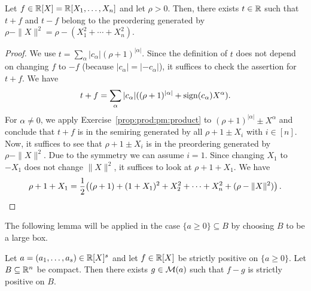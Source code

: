 \begin{lemma} \label{lem:t:minus:squares}
	Let $f \in \mathbb{R}[X] = \mathbb{R}[X_1,\ldots,X_n]$ and let $\rho > 0$. Then, there exists $t \in \mathbb{R}$ such that $t + f$ and $t- f$ belong to the preordering generated by $\rho - \|X\|^2 = \rho - (X_1^2 + \cdots + X_n^2)$. 
\end{lemma}
\begin{proof} 
	We use $t = \sum_\alpha |c_\alpha| (\rho+1)^{|\alpha|}$. Since the definition of $t$ does not depend on changing $f$ to $-f$ (because $|c_\alpha| = |-c_\alpha|$), it suffices to check the assertion for $t + f$. We have 
	\[
		t+ f = \sum_\alpha |c_\alpha| ( (\rho+1)^{|\alpha|} + \operatorname{sign}(c_\alpha) X^\alpha) .
	\]
	For $\alpha \ne 0$, we apply Exercise~\ref{prop:prod:pm:product} to  $(\rho+1)^{|\alpha|} \pm X^\alpha$ and conclude that $t+f$ is in the semiring generated by all $\rho+1 \pm X_i$ with $i \in [n]$. Now, it suffices to see that $\rho+1 \pm X_i$ is in the preordering generated by $\rho - \|X\|^2$. Due to the symmetry we can assume $i=1$. Since changing $X_1$ to $-X_1$ does not change $\|X\|^2$, it suffices to look at $\rho + 1 + X_1$. We have
	\[
		\rho+1 + X_1 = \frac{1}{2} \bigl( (\rho+1) + (1+X_1)^2 + X_2^2 + \cdots + X_n^2  + (\rho - \|X\|^2) \bigr) \,.\qedhere
	\]
\end{proof}
%
%
The following lemma will be applied in the case $\{a \ge 0 \} \subseteq B$ by choosing $B$ to be a large box. 
\begin{lemma} \label{lem:transfer}
	Let $a=(a_1,\ldots,a_s) \in \mathbb{R}[X]^s$ and let $f \in \mathbb{R}[X]$ be strictly positive on $\{a \ge 0\}$. Let $B \subseteq \mathbb{R}^n$ be compact. Then there exists $g \in \mathcal{M}(a)$ such that $f - g $ is strictly positive on $B$. 
\end{lemma}
